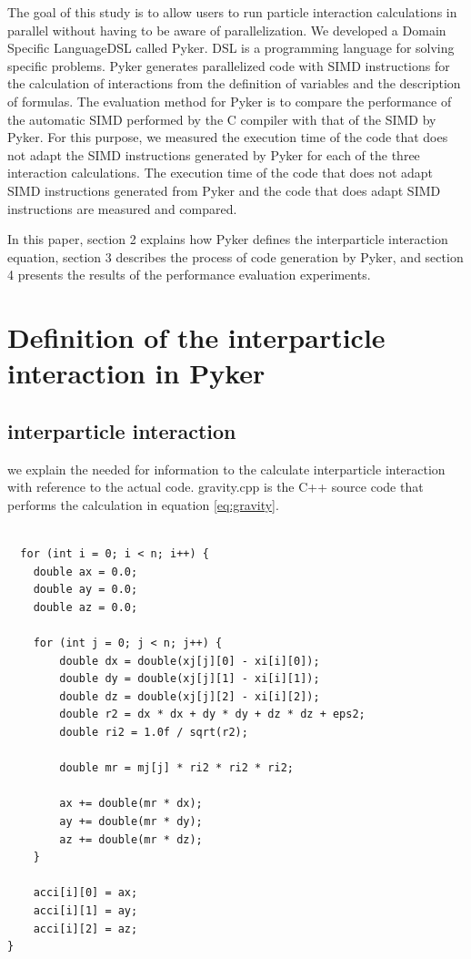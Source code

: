 \documentclass[ams, a4j]{U-AizuGT}
\begin{document}
The goal of this study is to allow users to run particle interaction 
calculations in parallel without having to be aware of parallelization.
We developed a Domain Specific Language\lparen DSL \rparen called Pyker.
DSL is a programming language for solving specific problems.
Pyker generates parallelized code with SIMD instructions for the 
calculation of interactions from the definition of variables and 
the description of formulas.
The evaluation method for Pyker is to compare the performance of 
the automatic SIMD  performed by the C compiler with that of the 
SIMD by Pyker. 
For this purpose, we measured the execution time of the code that
does not adapt the SIMD instructions generated by Pyker for each 
of the three interaction calculations.
The execution time of the code that does not adapt SIMD instructions
generated from Pyker and the code that does adapt SIMD instructions 
are measured and compared.

In this paper, section 2 explains how Pyker defines the interparticle 
interaction equation, section 3 describes the process of code generation 
by Pyker, and section 4 presents the results of the performance evaluation
experiments.

\section{Definition of the interparticle interaction in Pyker}

\subsection{interparticle interaction}
we explain the needed for information to the calculate interparticle 
interaction with reference to the actual code.
gravity.cpp is the C++ source code that performs the calculation 
in equation \eqref{eq:gravity}.
\begin{lstlisting}[frame=single, caption=skeleton code, label=fuga]
                  
  for (int i = 0; i < n; i++) {
    double ax = 0.0;
    double ay = 0.0;
    double az = 0.0;

    for (int j = 0; j < n; j++) {
        double dx = double(xj[j][0] - xi[i][0]);
        double dy = double(xj[j][1] - xi[i][1]);
        double dz = double(xj[j][2] - xi[i][2]);
        double r2 = dx * dx + dy * dy + dz * dz + eps2;
        double ri2 = 1.0f / sqrt(r2); 
        
        double mr = mj[j] * ri2 * ri2 * ri2;

        ax += double(mr * dx);
        ay += double(mr * dy);
        az += double(mr * dz);
    }

    acci[i][0] = ax;
    acci[i][1] = ay;
    acci[i][2] = az;
}
\end{lstlisting}
\end{document}

